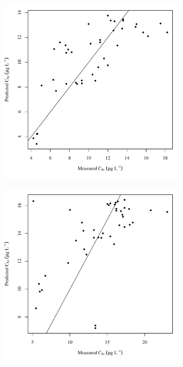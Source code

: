 \begin{linenumbers}
\subfiguretop
\begin{landscape}
	\begin{figure}
		\begin{subfigure}{0.7\textwidth}
			\centering
			\includegraphics[width=\tableCustomSize]{"Figures/Results_DSR/Stochastic/Conc Model pred v meas D101C"}
		\end{subfigure}%
		\begin{subfigure}{0.7\textwidth}
			\centering
			\includegraphics[width=\tableCustomSize]{"Figures/Results_DSR/Stochastic/Conc Model pred v meas D106C"}

\end{subfigure}
\end{figure}
\end{landscape}
\end{linenumbers}
